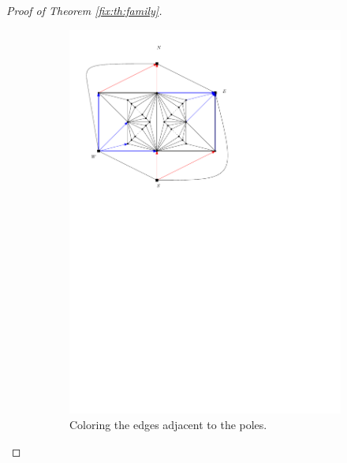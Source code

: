 \begin{proof}[Proof of Theorem \ref{fix:th:family}]
  \begin{figure}[h]
    \centering
    \begin{subfigure}[t]{0.3\textwidth}
      \includegraphics[width=\textwidth]{fixExtension/img/manymany1}
      \caption{Coloring the edges adjacent to the poles.}
      \label{fig:fix:manymany1}
    \end{subfigure}
    \quad
    \begin{subfigure}[t]{0.3\textwidth}

\end{subfigure}
\end{figure}
\end{proof}

